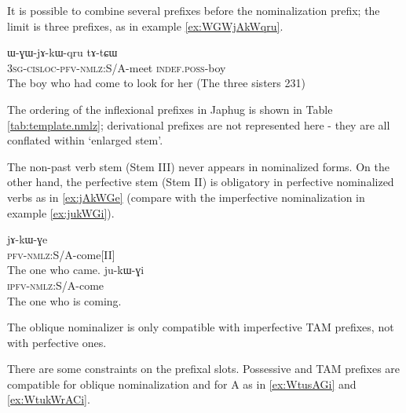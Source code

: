 \documentclass[oldfontcommands,oneside,a4paper,11pt]{article}
\newcommand{\ipa}[1]{{\phon #1}} %
\begin{document}
It is possible to combine several prefixes before the nominalization prefix; the limit is three prefixes, as in example \ref{ex:WGWjAkWqru}.

 \begin{exe}
\ex \label{ex:WGWjAkWqru}
\gll
  	\ipa{ɯ-ɣɯ-jɤ-kɯ-qru}  	\ipa{tɤ-tɕɯ}  	   \\
  \textsc{3sg-cisloc-pfv-nmlz:}S/A-meet \textsc{indef.poss}-boy   \\
\glt The boy  who had come to look for her (The three sisters 231)
 \end{exe}
 
The ordering of the inflexional prefixes in  Japhug is shown in Table \ref{tab:template.nmlz}; derivational prefixes are not represented here - they are all conflated within   `enlarged stem'.



\begin{table}[H]
\caption{The template of nominalized verbal forms in Japhug} \centering \label{tab:template.nmlz}
\end{table}

The non-past verb stem (Stem III) never appears in nominalized forms. On the other hand, the perfective stem (Stem II) is obligatory in perfective nominalized verbs as in \ref{ex:jAkWGe} (compare with the imperfective nominalization in example \ref{ex:jukWGi}).

 \begin{exe}
\ex \label{ex:jAkWGe}
\gll
  	\ipa{jɤ-kɯ-ɣe}	   \\
  \textsc{pfv-nmlz:}S/A-come[II]   \\
\glt The one who came.
\ex \label{ex:jukWGi}
\gll
  	\ipa{ju-kɯ-ɣi}	   \\
  \textsc{ipfv-nmlz:}S/A-come   \\
\glt The one who is coming.
 \end{exe}
 
The oblique nominalizer is only compatible with imperfective TAM prefixes, not with perfective ones. 
 
There are some constraints on  the prefixal slots. Possessive and TAM prefixes are compatible for oblique nominalization and for A as in \ref{ex:WtusAGi} and \ref{ex:WtukWrACi}.
\end{document}
